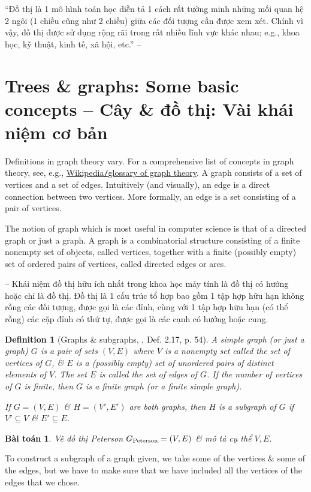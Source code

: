 \documentclass[oneside]{book}
\newtheorem{baitoan}{Bài toán}
\newtheorem{definition}{Definition}
\begin{document}
``Đồ thị là 1 mô hình toán học diễn tả 1 cách rất tường minh những mối quan hệ 2 ngôi (1 chiều cũng như 2 chiều) giữa các đối tượng cần được xem xét. Chính vì vậy, đồ thị được sử dụng rộng rãi trong rất nhiều lĩnh vực khác nhau; e.g., khoa học, kỹ thuật, kinh tế, xã hội, etc.'' -- \cite[Sect. 0.1.5, p. 13]{Thanh_computational_complexity_theory}

\section{Trees \& graphs: Some basic concepts -- Cây \& đồ thị: Vài khái niệm cơ bản}
Definitions in graph theory vary. For a comprehensive list of concepts in graph theory, see, e.g., \href{https://en.wikipedia.org/wiki/Glossary_of_graph_theory}{Wikipedia{\tt/}glossary of graph theory}. A graph consists of a set of vertices and
a set of edges. Intuitively (and visually), an edge is a direct connection between two vertices. More formally, an edge is a set consisting of
a pair of vertices.

The notion of graph which is most useful in computer science is that of a directed graph or just a graph. A graph is a combinatorial structure consisting of a finite nonempty set of objects, called vertices, together with a finite (possibly empty) set of ordered pairs of vertices, called directed edges or arcs.

-- Khái niệm đồ thị hữu ích nhất trong khoa học máy tính là đồ thị có hướng hoặc chỉ là đồ thị. Đồ thị là 1 cấu trúc tổ hợp bao gồm 1 tập hợp hữu hạn không rỗng các đối tượng, được gọi là các đỉnh, cùng với 1 tập hợp hữu hạn (có thể rỗng) các cặp đỉnh có thứ tự, được gọi là các cạnh có hướng hoặc cung.

\begin{definition}[Graphs \& subgraphs, \cite{Shahriari2022}, Def. 2.17, p. 54]
	A {\rm simple graph} (or just a {\rm graph}) $G$ is a pair of sets $(V,E)$ where $V$ is a nonempty set called the set of {\rm vertices} of $G$, \& $E$ is a (possibly empty) set of unordered pairs of distinct elements of $V$. The set $E$ is called the set of {\rm edges} of $G$. If the number of vertices of $G$ is finite, then $G$ is a {\rm finite graph} (or a {\rm finite simple graph}).
	
	If $G = (V,E)$ \& $H = (V',E')$ are both graphs, then $H$ is a {\rm subgraph} of $G$ if $V'\subseteq V$ \& $E'\subseteq E$.
\end{definition}

\begin{baitoan}
	Vẽ đồ thị Peterson $G_{\rm Peterson} = (V,E)$ \& mô tả cụ thể $V,E$.
\end{baitoan}
To construct a subgraph of a graph given, we take some of the vertices \& some of the edges, but we have to make sure that we have included all the vertices of the edges that we chose.
\end{document}
